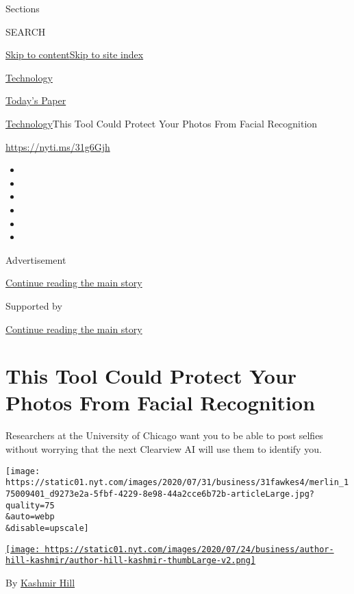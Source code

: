 Sections

SEARCH

\protect\hyperlink{site-content}{Skip to
content}\protect\hyperlink{site-index}{Skip to site index}

\href{https://www.nytimes.com/section/technology}{Technology}

\href{https://myaccount.nytimes.com/auth/login?response_type=cookie\&client_id=vi}{}

\href{https://www.nytimes.com/section/todayspaper}{Today's Paper}

\href{/section/technology}{Technology}\textbar{}This Tool Could Protect
Your Photos From Facial Recognition

\url{https://nyti.ms/31g6Gjh}

\begin{itemize}
\item
\item
\item
\item
\item
\item
\end{itemize}

Advertisement

\protect\hyperlink{after-top}{Continue reading the main story}

Supported by

\protect\hyperlink{after-sponsor}{Continue reading the main story}

\hypertarget{this-tool-could-protect-your-photos-from-facial-recognition}{%
\section{This Tool Could Protect Your Photos From Facial
Recognition}\label{this-tool-could-protect-your-photos-from-facial-recognition}}

Researchers at the University of Chicago want you to be able to post
selfies without worrying that the next Clearview AI will use them to
identify you.

\texttt{[image: https://static01.nyt.com/images/2020/07/31/business/31fawkes4/merlin\_175009401\_d9273e2a-5fbf-4229-8e98-44a2cce6b72b-articleLarge.jpg?quality=75\\\&auto=webp\\\&disable=upscale]}

\href{https://www.nytimes.com/by/kashmir-hill}{\texttt{[image: https://static01.nyt.com/images/2020/07/24/business/author-hill-kashmir/author-hill-kashmir-thumbLarge-v2.png]}}

By \href{https://www.nytimes.com/by/kashmir-hill}{Kashmir Hill}


